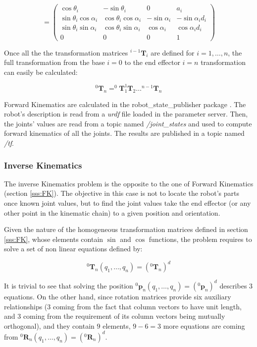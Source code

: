 $$
=
\left(\begin{array}{cccc}
\cos \theta_{i} & -\sin \theta_{i} & 0 & a_{i} \\
\sin \theta_{i} \cos \alpha_{i} & \cos \theta_{i} \cos \alpha_{i} & -\sin \alpha_{i} & -\sin \alpha_{i} d_{i} \\
\sin \theta_{i} \sin \alpha_{i} & \cos \theta_{i} \sin \alpha_{i} & \cos \alpha_{i} & \cos \alpha_{i} d_{i} \\
0 & 0 & 0 & 1
\end{array}\right)
$$

Once all the the transformation matrices $^{i-1}\mathbf{T}_{i}$ are defined for $i = 1,  \dots, n$, the full transformation from the base $i=0$ to the end effector $i=n$ transformation can easily be calculated:

$$
^{0}\mathbf{T}_{n} = ^{0}\mathbf{T}_{1} ^{1}\mathbf{T}_{2} \dots ^{n-1}\mathbf{T}_{n}
$$

Forward Kinematics are calculated in the robot\_state\_publisher package \cite{rosstatepublisher}. The robot's description is read from a \textit{urdf} file loaded in the parameter server. Then, the joints' values are read from a topic named \textit{/joint\_states} and used to compute forward kinematics of all the joints. The results are published in a topic named \textit{/tf}.

\subsubsection{Inverse Kinematics}
\label{sss:IK}

The inverse Kinematics problem is the opposite to the one of Forward Kinematics (section \ref{sss:FK}). The objective in this case is not to locate the robot's parts once known joint values, but to find the joint values take the end effector (or any other point in the kinematic chain) to a given position and orientation.

Given the nature of the homogeneous transformation matrices defined in section \ref{sss:FK}, whose elements contain $\sin$ and $\cos$ functions, the problem requires to solve a set of non linear equations defined by:

$$
^{0}\mathbf{T}_{n}(q_{1}, \dots, q_{n}) = (^{0}\mathbf{T}_{n})^{d}
$$

It is trivial to see that solving the position $^{0} \boldsymbol{p}_{n}(q_{1}, \dots, q_{n}) = (^{0} \boldsymbol{p}_{n})^{d}$ describes $3$ equations. On the other hand, since rotation matrices provide six auxiliary relationships ($3$ coming from the fact that column vectors to have unit length, and $3$ coming from the requirement of its column vectors being mutually orthogonal), and they contain $9$ elements, $9 - 6 = 3$ more equations are coming from $^{0} \mathbf{R}_{n}(q_{1}, \dots, q_{n}) = (^{0} \mathbf{R}_{n})^{d}$.

